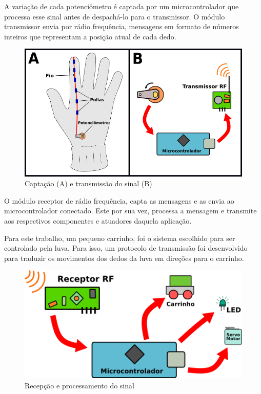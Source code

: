 \documentclass[
	12pt,				%
	openright,			%
	oneside,			%
	a4paper,			%
	english,			%
	brazil				%
	]{abntex2}
\begin{document}
			A variação de cada potenciômetro é captada por um microcontrolador que processa esse sinal antes de despachá-lo para o transmissor. O módulo transmissor envia por rádio frequência, mensagens em formato de números inteiros que representam a posição atual de cada dedo.

		\begin{figure}[h!]
			\centering
  		\includegraphics[scale=0.7]{./figures/glove-and-transmitter1.png}
			\caption{Captação (A) e transmissão do sinal (B)}
  		\label{Fig:glove-and-transmitter1}
		\end{figure}

			O módulo receptor de rádio frequência, capta as mensagens e as envia ao microcontrolador conectado. Este por sua vez, processa a mensagem e transmite aos respectivos componentes e atuadores daquela aplicação.

			Para este trabalho, um pequeno carrinho, foi o sistema escolhido para ser controlado pela luva. Para isso, um protocolo de transmissão foi desenvolvido para traduzir os movimentos dos dedos da luva em direções para o carrinho.
	
		\begin{figure}[h!]
			\centering
  		\includegraphics[scale=0.8]{./figures/receptor1.png}
			\caption{Recepção e processamento do sinal}
  		\label{Fig:receptor1}
		\end{figure}
\end{document}
